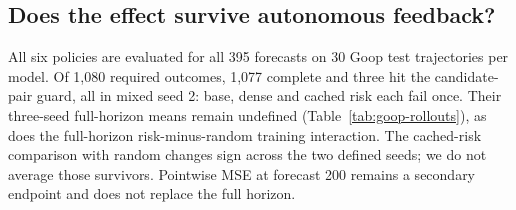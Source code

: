 \subsection{Does the effect survive autonomous feedback?}
All six policies are evaluated for all 395 forecasts on 30 Goop test trajectories per model. Of 1,080 required outcomes, 1,077 complete and three hit the candidate-pair guard, all in mixed seed 2: base, dense and cached risk each fail once. Their three-seed full-horizon means remain undefined (Table~\ref{tab:goop-rollouts}), as does the full-horizon risk-minus-random training interaction. The cached-risk comparison with random changes sign across the two defined seeds; we do not average those survivors. Pointwise MSE at forecast 200 remains a secondary endpoint and does not replace the full horizon.

